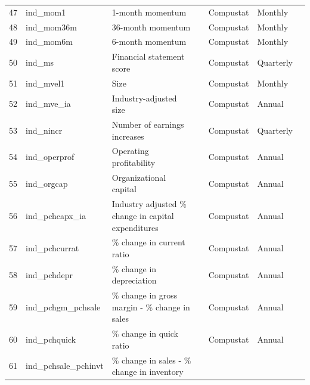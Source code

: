 \documentclass[11pt, a4paper, table]{article}
\begin{document}
\begin{landscape}
\begin{center}
\begin{longtable}{lllllll}
			47 & ind\_mom1 & 1-month momentum & 
				\cite{jegadeesh_returns_1993} & Compustat & Monthly \\
			48 & ind\_mom36m\footnotemark[\value{footnote}] & 36-month momentum & 
				\cite{jegadeesh_returns_1993} & Compustat & Monthly \\
			49 & ind\_mom6m & 6-month momentum & 
				\cite{jegadeesh_returns_1993} & Compustat & Monthly \\
			50 & ind\_ms & Financial statement score & 
				\cite{mohanram_separating_2005} & Compustat & Quarterly \\
			51 & ind\_mvel1 & Size & 
				\cite{banz_relationship_1981} & Compustat & Monthly \\
			52 & ind\_mve\_ia & Industry-adjusted size & 
				\cite{asness_predicting_2000} & Compustat & Annual \\
			53 & ind\_nincr & Number of earnings increases & 
				\cite{barth_market_1999} & Compustat & Quarterly \\
			54 & ind\_operprof\footnotemark[\value{footnote}] & Operating profitability & 
				\cite{fama_five-factor_2015} & Compustat & Annual \\
			55 & ind\_orgcap\footnotemark[\value{footnote}] & Organizational capital & 
				\cite{eisfeldt_organization_2013} & Compustat & Annual \\
			56 & ind\_pchcapx\_ia\footnotemark[\value{footnote}] & Industry adjusted \% change in capital expenditures & 
				\cite{abarbanell_abnormal_1998} & Compustat & Annual \\
			57 & ind\_pchcurrat\footnotemark[\value{footnote}] & \% change in current ratio & 
				\cite{ou_financial_1989} & Compustat & Annual \\
			58 & ind\_pchdepr\footnotemark[\value{footnote}] & \% change in depreciation & 
				\cite{holthausen_prediction_1992} & Compustat & Annual \\
			59 & ind\_pchgm\_pchsale\footnotemark[\value{footnote}] & \% change in gross margin - \% change in sales & 
				\cite{abarbanell_abnormal_1998} & Compustat & Annual \\
			60 & ind\_pchquick\footnotemark[\value{footnote}] & \% change in quick ratio & 
				\cite{ou_financial_1989} & Compustat & Annual \\
			61 & ind\_pchsale\_pchinvt\footnotemark[\value{footnote}] & \% change in sales - \% change in inventory & 

\end{longtable}
\end{center}
\end{landscape}
\end{document}
